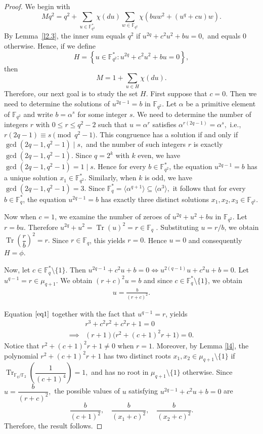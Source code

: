 \documentclass[12pt]{amsart}
\theoremstyle{definition}
\theoremstyle{remark}
\numberwithin{equation}{section}
\begin{document}
\begin{proof}
We begin with
$$
Mq^2
=
q^2+\sum_{u\in \mathbb{F}_{q^2}^*}\chi(du)\sum_{w\in \mathbb{F}_{q^2}}
\chi\!\left(buw^2+(u^q+cu)w\right).
$$
By Lemma~\ref{l2.3}, the inner sum equals $q^2$ if
$
u^{2q}+c^2u^2+bu=0,
$
and equals $0$ otherwise. Hence, if we define
$$
H=\left\{u\in \mathbb{F}_{q^2}^* : u^{2q}+c^2u^2+bu=0\right\},
$$
then
$$
M=1+\sum_{u\in H}\chi(du).
$$
Therefore, our next goal is to study the set $H$.
First suppose that $c=0$. Then we need to determine the solutions of
$
u^{2q-1}=b
$
in $\mathbb{F}_{q^2}$. Let $\alpha$ be a primitive element of $\mathbb{F}_{q^2}$ and write
$
b=\alpha^s
$
for some integer $s$. We need to determine the number of integers $r$ with
$
0 \leq r \leq q^2-2
$
such that $u=\alpha^r$ satisfies
$
\alpha^{r(2q-1)}=\alpha^s,
$
i.e.,
$
r(2q-1)\equiv s \pmod{q^2-1}.
$ This congruence has a solution if and only if
$
\gcd(2q-1,q^2-1)\mid s,
$
and the number of such integers $r$ is exactly
$
\gcd(2q-1,q^2-1).
$
Since $q=2^k$ with $k$ even, we have
$
\gcd(2q-1,q^2-1)=1\mid s.
$
Hence for every $b\in \mathbb{F}_{q^2}^*$, the equation
$
u^{2q-1}=b
$
has a unique solution $x_1\in \mathbb{F}_{q^2}^*$. Similarly, when $k$ is odd, we have
$
\gcd(2q-1,q^2-1)=3.
$
Since $\mathbb{F}_q^*=\langle \alpha^{q+1}\rangle \subseteq \langle \alpha^3\rangle,
$
it follows that for every $b\in \mathbb{F}_q^*$, the equation
$
u^{2q-1}=b
$
has exactly three distinct solutions $x_1,x_2,x_3\in \mathbb{F}_{q^2}.
$

Now when $c=1$, we examine the number of zeroes of 
$
u^{2q}+u^2+bu
$ in $\mathbb{F}_{q^2}$.
Let
$
r=bu$. Therefore
$ u^{2q}+u^2=\operatorname{Tr}(u)^2=r\in\mathbb{F}_{q}$ . Substituting $u=r/b$, we obtain
$
\operatorname{Tr}\!\left(\dfrac{r}{b}\right)^2=r.
$
Since $r\in \mathbb{F}_q$, this yields
$
r=0.
$
Hence $u=0$ and consequently $H=\phi$. 

Now, let $c\in \mathbb{F}_q^*\setminus\{1\}$. Then $u^{2q-1}+c^2u+b=0 
\iff u^{2(q-1)}u+c^2u+b=0$. Let $u^{q-1}=r\in \mu_{q+1}$. We obtain $(r+c)^2u=b$ and since $c\in \mathbb{F}_q^*\setminus\{1\}$, we obtain
\begin{align}\label{eq1}
u=\frac{b}{(r+c)^2}.
\end{align}

Equation $\ref{eq1}$ together with the fact that $u^{q-1}=r$, yields
\begin{align*}
&r^3+c^2r^2+c^2r+1=0\\
\implies& (r+1)\bigl(r^2+(c+1)^2r+1\bigr)=0. 
\end{align*}
Notice that
$
r^2+(c+1)^2r+1\neq 0
$
when $r=1$. Moreover, by Lemma \ref{l4}, the polynomial
$
r^2+(c+1)^2r+1
$
has two distinct roots $x_1,x_2\in \mu_{q+1}\setminus \{1\}$ if
$
\operatorname{Tr}_{\mathbb{F}_q/\mathbb{F}_2}\left(\dfrac{1}{(c+1)^4}\right)=1,
$
and has no root in $\mu_{q+1}\setminus\{1\}$ otherwise. Since
$
u=\dfrac{b}{(r+c)^2},
$
the possible values of $u$ satisfying $u^{2q-1}+c^2u+b=0$ are
$$
\frac{b}{(c+1)^2}, \quad \frac{b}{(x_1+c)^2}, \quad \frac{b}{(x_2+c)^2}.
$$
Therefore, the result follows.
\end{proof}    
\end{document}
